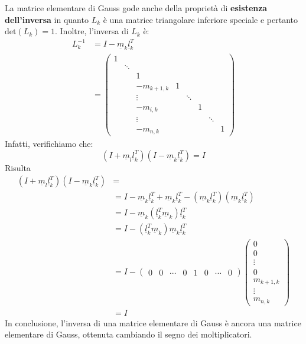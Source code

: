 \documentclass[12pt]{report}
\begin{document}
La matrice elementare di Gauss gode anche della proprietà di \textbf{esistenza dell'inversa} in quanto $L_k$ è una matrice triangolare inferiore speciale e pertanto $\text{det}(L_k) = 1$. Inoltre, l'inversa di $L_k$ è:
\begin{align*}
L_k^{-1} &= I - \underline{m}_k\underline{l}_k^T  \\
&= \begin{pmatrix}
	1  \\
	& \ddots \\
	& & 1 \\
	& & -m_{k+1, k} & 1 \\
	& & \vdots & & \ddots \\
	& & -m_{i, k} & & & 1 \\
	& & \vdots & & & & \ddots \\
	& & -m_{n, k} & & & & & 1
\end{pmatrix}
\end{align*}
Infatti, verifichiamo che:
\[
(I + \underline{m}_l\underline{l}_k^T)(I - \underline{m}_k\underline{l}_k^T) = I
\]
Risulta
\begin{align*}
	(I + \underline{m}_l\underline{l}_k^T)(I - \underline{m}_k\underline{l}_k^T) &= \\
	&= I - \underline{m}_k\underline{l}_k^T + \underline{m}_k\underline{l}_k^T - (\underline{m}_k\underline{l}_k^T)(\underline{m}_k\underline{l}_k^T) \\
	&= I - \underline{m}_k(\underline{l}_k^T\underline{m}_k)\underline{l}_k^T \\
	&= I - (\underline{l}_k^T\underline{m}_k)\underline{m}_k\underline{l}_k^T \\
	&= I - \begin{pmatrix}
		0 & 0 & \cdots & 0 & 1 & 0 & \cdots & 0
	\end{pmatrix}\begin{pmatrix}
		0  \\
		0  \\
		\vdots \\
		0 \\
		m_{k+1, k} \\
		\vdots \\
		m_{n, k}
	\end{pmatrix} \\
	&= I
\end{align*}
In conclusione, l'inversa di una matrice elementare di Gauss è ancora una matrice elementare di Gauss, ottenuta cambiando il segno dei moltiplicatori.
\end{document}
